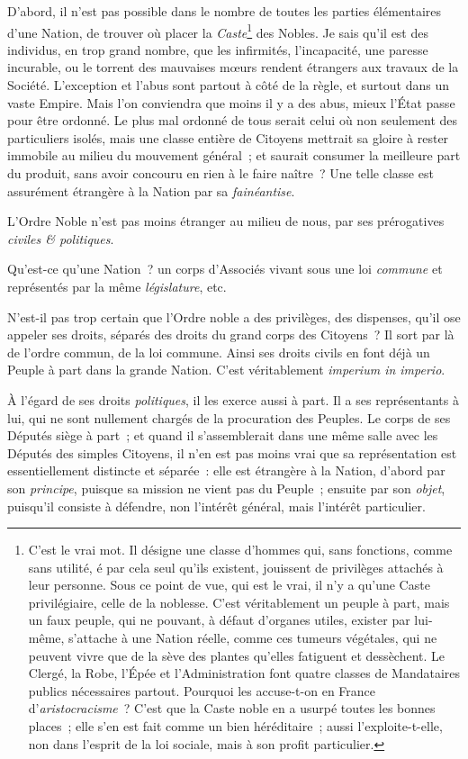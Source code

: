 \documentclass[french,twoside]{book} %
\begin{document}
D’abord, il n’est pas possible dans le nombre de toutes les parties élémentaires d’une Nation, de trouver où placer la {\itshape Caste}\footnote{C’est le vrai mot. Il désigne une classe d’hommes qui, sans fonctions, comme sans utilité, é par cela seul qu’ils existent, jouissent de privilèges attachés à leur personne. Sous ce point de vue, qui est le vrai, il n’y a qu’une Caste privilégiaire, celle de la noblesse. C’est véritablement un peuple à part, mais un faux peuple, qui ne pouvant, à défaut d’organes utiles, exister par lui-même, s’attache à une Nation réelle, comme ces tumeurs végétales, qui ne peuvent vivre que de la sève des plantes qu’elles fatiguent et dessèchent. Le Clergé, la Robe, l’Épée et l’Administration font quatre classes de Mandataires publics nécessaires partout. Pourquoi les accuse-t-on en France d’{\itshape aristocracisme} ? C’est que la Caste noble en a usurpé toutes les bonnes places ; elle s’en est fait comme un bien héréditaire ; aussi l’exploite-t-elle, non dans l’esprit de la loi sociale, mais à son profit particulier.} des Nobles. Je sais qu’il est des individus, en trop grand nombre, que les infirmités, l’incapacité, une paresse incurable, ou le torrent des mauvaises mœurs rendent étrangers aux travaux de la Société. L’exception et l’abus sont partout à côté de la règle, et surtout dans un vaste Empire. Mais l’on conviendra que moins il y a des abus, mieux l’État passe pour être ordonné. Le plus mal ordonné de tous serait celui où non seulement des particuliers isolés, mais une classe entière de Citoyens mettrait sa gloire à rester immobile au milieu du mouvement général ; et saurait consumer la meilleure part du produit, sans avoir concouru en rien à le faire naître ? Une telle classe est assurément étrangère à la Nation par sa {\itshape fainéantise}.\par
L’Ordre Noble n’est pas moins étranger au milieu de nous, par ses prérogatives {\itshape civiles \& politiques}.\par
Qu’est-ce qu’une Nation ? un corps d’Associés vivant sous une loi {\itshape commune} et représentés par la même {\itshape législature}, etc.\par
N’est-il pas trop certain que l’Ordre noble a des privilèges, des dispenses, qu’il ose appeler ses droits, séparés des droits du grand corps des Citoyens ? Il sort par là de l’ordre commun, de la loi commune. Ainsi ses droits civils en font déjà un Peuple à part dans la grande Nation. C’est véritablement {\itshape imperium in imperio}.\par
À l’égard de ses droits {\itshape politiques}, il les exerce aussi à part. Il a ses représentants à lui, qui ne sont nullement chargés de la procuration des Peuples. Le corps de ses Députés siège à part ; et quand il s’assemblerait dans une même salle avec les Députés des simples Citoyens, il n’en est pas moins vrai que sa représentation est essentiellement distincte et séparée : elle est étrangère à la Nation, d’abord par son {\itshape principe}, puisque sa mission ne vient pas du Peuple ; ensuite par son {\itshape objet}, puisqu’il consiste à défendre, non l’intérêt général, mais l’intérêt particulier.\par
\end{document}
